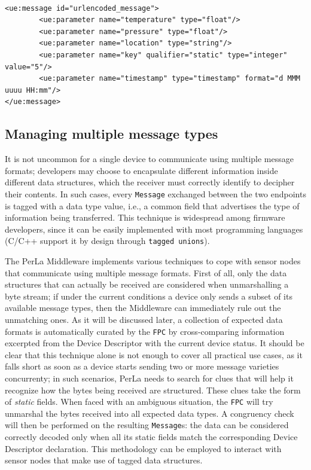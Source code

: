 \lstset{language=XML}
\begin{lstlisting}[float,floatplacement=!hbt,caption={An URLEncoded message
declaration. Thanks to the custom \texttt{URLEncodedMessageDescriptor}, trying
to create a non-primitive field results in an exception. Note the custom
\texttt{format} attribute on the timestamp field, which is employed to define
the encoding format for dates and times},label={lst:urlencodedmessage}]

<ue:message id="urlencoded_message">
        <ue:parameter name="temperature" type="float"/>
        <ue:parameter name="pressure" type="float"/>
        <ue:parameter name="location" type="string"/>
        <ue:parameter name="key" qualifier="static" type="integer" value="5"/>
        <ue:parameter name="timestamp" type="timestamp" format="d MMM uuuu HH:mm"/>
</ue:message>

\end{lstlisting}


\subsection{Managing multiple message types}

It is not uncommon for a single device to communicate using multiple message
formats; developers may choose to encapsulate different information inside
different data structures, which the receiver must correctly identify to
decipher their contents. In such cases, every \texttt{Message} exchanged
between the two endpoints is tagged with a data type value, i.e., a common
field that advertises the type of information being transferred. This technique
is widespread among firmware developers, since it can be easily implemented
with most programming languages (C/C++ support it by design through
\texttt{tagged unions}).

The PerLa Middleware implements various techniques to cope with sensor nodes
that communicate using multiple message formats. First of all, only the data
structures that can actually be received are considered when unmarshalling a
byte stream; if under the current conditions a device only sends a subset of
its available message types, then the Middleware can immediately rule out the
unmatching ones. As it will be discussed later, a collection of expected data
formats is automatically curated by the \texttt{FPC} by cross-comparing
information excerpted from the Device Descriptor with the current device
status. It should be clear that this technique alone is not enough to cover all
practical use cases, as it falls short as soon as a device starts sending two
or more message varieties concurrenty; in such scenarios, PerLa needs to search
for clues that will help it recognize how the bytes being received are
structured. These clues take the form of \textit{static} fields. When faced
with an ambiguous situation, the \texttt{FPC} will try unmarshal the bytes
received into all expected data types. A congruency check will then be
performed on the resulting \texttt{Message}s: the data can be considered
correctly decoded only when all its static fields match the corresponding
Device Descriptor declaration. This methodology can be employed to interact
with sensor nodes that make use of tagged data structures. 


